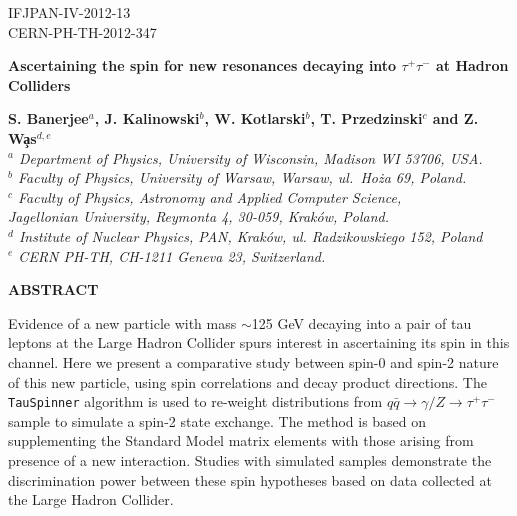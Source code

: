 \documentclass[12pt]{article}
\begin{document}
\begin{titlepage}
 
\begin{flushright} 
{ IFJPAN-IV-2012-13 \\ CERN-PH-TH-2012-347} 
\end{flushright}

\vspace{0.2cm} 
\begin{center}

{\Huge \bf Ascertaining the spin for new resonances decaying into ${\mathbb\tau^+ \tau^-}$  at Hadron Colliders}
\end{center}
\vspace*{5mm}

 
\begin{center}
   {\bf S. Banerjee$^{a}$,  J. Kalinowski$^{b}$,  W. Kotlarski$^{b}$,  T. Przedzinski$^{c}$  and Z. W\c{a}s$^{d,e}$}\\
{\em $^a$ Department of Physics, University of Wisconsin, Madison WI  53706, USA.}\\
{\em $^b$ Faculty of Physics, University of Warsaw, Warsaw, ul.\ Ho\.za 69, Poland.}\\
{\em $^c $ Faculty of Physics, Astronomy and Applied Computer Science,\\
Jagellonian University, Reymonta 4, 30-059, Krak\'ow, Poland.}\\
{\em $^d$ Institute of Nuclear Physics, PAN, Krak\'ow, ul. Radzikowskiego 152, Poland}\\
{\em $^e$ CERN PH-TH, CH-1211 Geneva 23, Switzerland.}
\end{center}
\vspace{.1 cm}
\begin{center}
{\bf   ABSTRACT  }
\end{center} 

Evidence of a new particle  with mass $\sim$125 GeV decaying into a pair of tau leptons at the Large Hadron Collider spurs interest in ascertaining its spin in this channel.
Here we present a comparative study between spin-0 and spin-2 nature of this new particle, using spin correlations and decay product directions.
The {\tt TauSpinner} algorithm is used to re-weight distributions from $q \bar q \to \gamma/Z \to \tau^+ \tau^-$ sample to simulate a spin-2 state exchange.
The method is based on supplementing the Standard Model matrix elements with those arising from presence of a new interaction.
Studies with simulated samples demonstrate the discrimination power between these spin hypotheses based on data collected at the Large Hadron Collider.
 

\end{titlepage}
\end{document}

